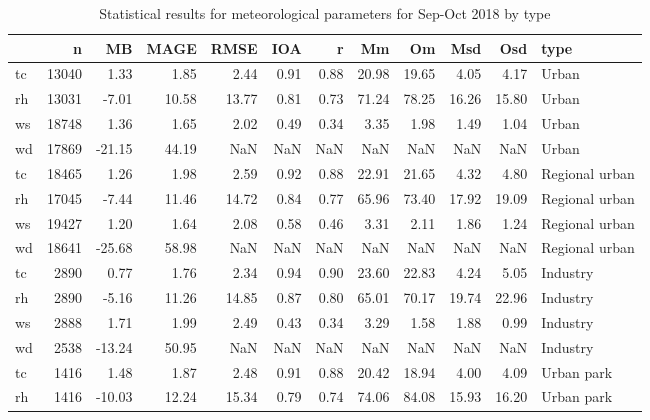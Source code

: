 \begin{table}
\centering
\caption{Statistical results for meteorological parameters for Sep-Oct 2018 by type}
\label{tab:stats_all_type}
\begin{tabular}{lrrrrrrrrrrl}
\toprule
{} &      n &     MB &   MAGE &   RMSE &   IOA &     r &     Mm &     Om &    Msd &    Osd &                 type \\
\midrule
tc &  13040 &   1.33 &   1.85 &   2.44 &  0.91 &  0.88 &  20.98 &  19.65 &   4.05 &   4.17 &                Urban \\
rh &  13031 &  -7.01 &  10.58 &  13.77 &  0.81 &  0.73 &  71.24 &  78.25 &  16.26 &  15.80 &                Urban \\
ws &  18748 &   1.36 &   1.65 &   2.02 &  0.49 &  0.34 &   3.35 &   1.98 &   1.49 &   1.04 &                Urban \\
wd &  17869 & -21.15 &  44.19 &    NaN &   NaN &   NaN &    NaN &    NaN &    NaN &    NaN &                Urban \\
tc &  18465 &   1.26 &   1.98 &   2.59 &  0.92 &  0.88 &  22.91 &  21.65 &   4.32 &   4.80 &       Regional urban \\
rh &  17045 &  -7.44 &  11.46 &  14.72 &  0.84 &  0.77 &  65.96 &  73.40 &  17.92 &  19.09 &       Regional urban \\
ws &  19427 &   1.20 &   1.64 &   2.08 &  0.58 &  0.46 &   3.31 &   2.11 &   1.86 &   1.24 &       Regional urban \\
wd &  18641 & -25.68 &  58.98 &    NaN &   NaN &   NaN &    NaN &    NaN &    NaN &    NaN &       Regional urban \\
tc &   2890 &   0.77 &   1.76 &   2.34 &  0.94 &  0.90 &  23.60 &  22.83 &   4.24 &   5.05 &             Industry \\
rh &   2890 &  -5.16 &  11.26 &  14.85 &  0.87 &  0.80 &  65.01 &  70.17 &  19.74 &  22.96 &             Industry \\
ws &   2888 &   1.71 &   1.99 &   2.49 &  0.43 &  0.34 &   3.29 &   1.58 &   1.88 &   0.99 &             Industry \\
wd &   2538 & -13.24 &  50.95 &    NaN &   NaN &   NaN &    NaN &    NaN &    NaN &    NaN &             Industry \\
tc &   1416 &   1.48 &   1.87 &   2.48 &  0.91 &  0.88 &  20.42 &  18.94 &   4.00 &   4.09 &           Urban park \\
rh &   1416 & -10.03 &  12.24 &  15.34 &  0.79 &  0.74 &  74.06 &  84.08 &  15.93 &  16.20 &           Urban park \\

\end{tabular}
\end{table}
